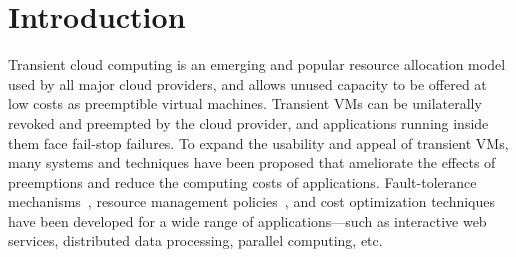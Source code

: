 \section{Introduction}
\label{sec:intro}








Transient cloud computing is an emerging and popular resource allocation model used by all major cloud providers, and allows unused capacity to be offered at low costs as preemptible virtual machines.
%
Transient VMs can be unilaterally revoked and preempted by the cloud provider, and applications running inside them face fail-stop failures.
%
%
%
To expand the usability and appeal of transient VMs, many systems and techniques have been proposed that  ameliorate the effects of preemptions and reduce the computing costs of applications. 
%
Fault-tolerance mechanisms~\cite{spotcheck, marathe2014exploiting}, resource management policies~\cite{exosphere, conductor}, and cost optimization techniques~\cite{dubois2016optispot, shastri2017hotspot} have been developed for a wide range of applications---such as interactive web services, distributed data processing, parallel computing, etc.
%



